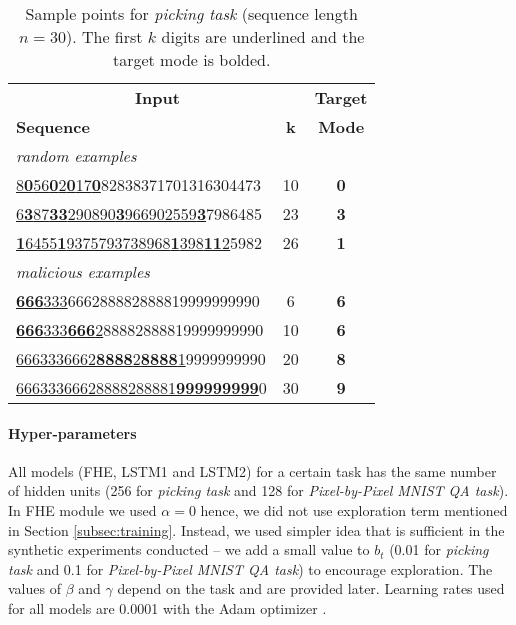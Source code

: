 \begin{table}[ht!]
\vskip -0.1in
\caption{Sample points for \emph{picking task} (sequence length \mbox{$n=30$}). The first $k$ digits are underlined and the target mode is bolded.}
\label{table:pickingSample}
\vskip 0.1in
\begin{center}
\begin{small}
\begin{sc}
\begin{tabular}{l c | c} 
\toprule
\multicolumn{2}{c|}{\textbf{Input}} & \textbf{Target}\\
\textbf{Sequence} & \textbf{k} & \textbf{Mode}\\
\midrule
\textit{random examples} &&\\
\underline{8\textbf{0}56\textbf{0}2\textbf{0}17\textbf{0}}82838371701316304473 & 10 & \textbf{0}\\
\underline{6\textbf{3}87\textbf{33}290890\textbf{3}966902559\textbf{3}}7986485 & 23 & \textbf{3}\\
\underline{\textbf{1}6455\textbf{1}9375793738968\textbf{1}398\textbf{11}2}5982 & 26 & \textbf{1}\\
\midrule
\textit{malicious examples} &&\\
\underline{\textbf{666}333}666288882888819999999990 & 6 & \textbf{6}\\
\underline{\textbf{666}333\textbf{666}2}88882888819999999990 & 10 & \textbf{6}\\
\underline{6663336662\textbf{8888}2\textbf{8888}1}9999999990 & 20 & \textbf{8}\\
\underline{66633366628888288881\textbf{999999999}}0 & 30 & \textbf{9}\\
\bottomrule
\end{tabular}
\end{sc}
\end{small}
\end{center}
\vskip -0.25in
\end{table}

\paragraph{Hyper-parameters} All models (FHE, LSTM1 and LSTM2) for a certain task has the same number of hidden units (256 for \emph{picking task} and 128 for \emph{Pixel-by-Pixel MNIST QA task}).
In FHE module we used $\alpha=0$ hence, we did not use exploration term mentioned in Section \ref{subsec:training}. Instead, we used simpler idea that is sufficient in the  synthetic experiments conducted -- we add a small value to $b_t$ (0.01 for \emph{picking task} and 0.1 for \emph{Pixel-by-Pixel MNIST QA task}) to encourage exploration. The values of $\beta$ and $\gamma$ depend on the task and are provided later. Learning rates used for all models are 0.0001 with the Adam optimizer \cite{kingmaandba2014}.


